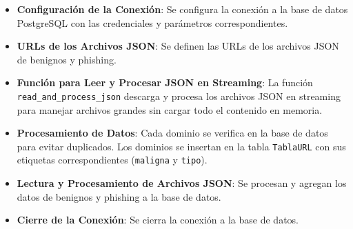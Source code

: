 \begin{itemize}
    \item \textbf{Configuración de la Conexión}: Se configura la conexión a la base de datos PostgreSQL con las credenciales y parámetros correspondientes.
    \item \textbf{URLs de los Archivos JSON}: Se definen las URLs de los archivos JSON de benignos y phishing.
    \item \textbf{Función para Leer y Procesar JSON en Streaming}: La función \texttt{read\_and\_process\_json} descarga y procesa los archivos JSON en streaming para manejar archivos grandes sin cargar todo el contenido en memoria.
    \item \textbf{Procesamiento de Datos}: Cada dominio se verifica en la base de datos para evitar duplicados. Los dominios se insertan en la tabla \texttt{TablaURL} con sus etiquetas correspondientes (\texttt{maligna} y \texttt{tipo}).
    \item \textbf{Lectura y Procesamiento de Archivos JSON}: Se procesan y agregan los datos de benignos y phishing a la base de datos.
    \item \textbf{Cierre de la Conexión}: Se cierra la conexión a la base de datos.
\end{itemize}
